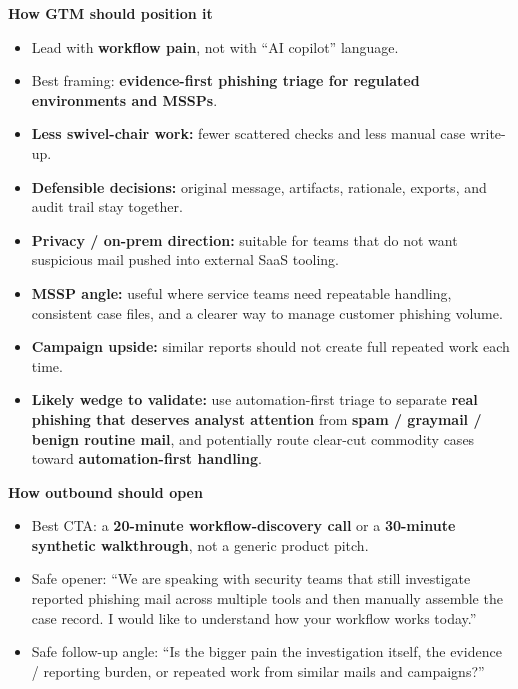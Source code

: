 \documentclass[10pt,a4paper]{article}
\begin{document}
\noindent\textbf{How GTM should position it}
\begin{itemize}
  \item Lead with \textbf{workflow pain}, not with ``AI copilot'' language.
  \item Best framing: \textbf{evidence-first phishing triage for regulated environments and MSSPs}.
  \item \textbf{Less swivel-chair work:} fewer scattered checks and less manual case write-up.
  \item \textbf{Defensible decisions:} original message, artifacts, rationale, exports, and audit trail stay together.
  \item \textbf{Privacy / on-prem direction:} suitable for teams that do not want suspicious mail pushed into external SaaS tooling.
  \item \textbf{MSSP angle:} useful where service teams need repeatable handling, consistent case files, and a clearer way to manage customer phishing volume.
  \item \textbf{Campaign upside:} similar reports should not create full repeated work each time.
  \item \textbf{Likely wedge to validate:} use automation-first triage to separate \textbf{real phishing that deserves analyst attention} from \textbf{spam / graymail / benign routine mail}, and potentially route clear-cut commodity cases toward \textbf{automation-first handling}.
\end{itemize}

\noindent\textbf{How outbound should open}
\begin{itemize}
  \item Best CTA: a \textbf{20-minute workflow-discovery call} or a \textbf{30-minute synthetic walkthrough}, not a generic product pitch.
  \item Safe opener: ``We are speaking with security teams that still investigate reported phishing mail across multiple tools and then manually assemble the case record. I would like to understand how your workflow works today.''
  \item Safe follow-up angle: ``Is the bigger pain the investigation itself, the evidence / reporting burden, or repeated work from similar mails and campaigns?''
\end{itemize}
\end{document}
